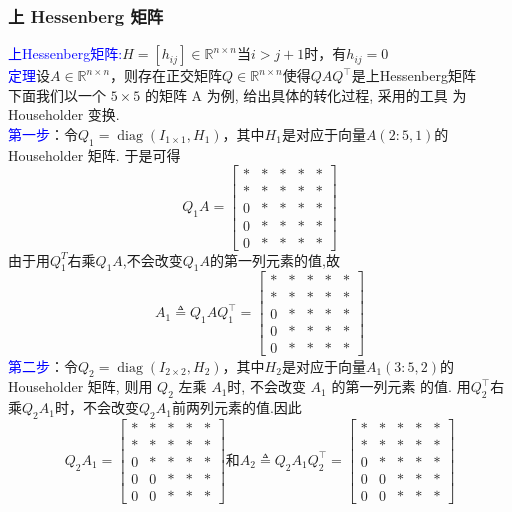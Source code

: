 \documentclass[12pt,a4paper]{article}
\begin{document}
	\subsubsection{上 Hessenberg 矩阵}
	\noindent \textcolor{blue}{上Hessenberg矩阵:}$H=\left[h_{i j}\right] \in \mathbb{R}^{n \times n}$当$i>j+1$时，有$h_{i j}=0$\\
	\textcolor{blue}{定理}设$A \in \mathbb{R}^{n \times n}$，则存在正交矩阵$Q \in \mathbb{R}^{n \times n}$使得$Q A Q^{\top}$是上Hessenberg矩阵\\
	下面我们以一个 $5\times 5$ 的矩阵 A 为例, 给出具体的转化过程, 采用的工具 为 Householder 变换.\\
	\textcolor{blue}{第一步}：令$Q_{1}=\operatorname{diag}\left(I_{1 \times 1}, H_{1}\right)$，其中$H_{1}$是对应于向量$A(2 : 5,1)$的 Householder 矩阵. 于是可得
	$$
	Q_{1} A=\left[\begin{array}{ccccc}
	* &*& *& *&* \\ 
	* &*& *& *&* \\ 
	0 &*& *& *&*\\ 
	0 &*& *& *&*\\ 
	0 &*& *& *&*
	\end{array}\right]
	$$
	由于用$Q_{1}^{T}$右乘$Q_{1} A$,不会改变$Q_{1} A$的第一列元素的值,故
	$$
	A_{1} \triangleq Q_{1} A Q_{1}^{\top}=\left[\begin{array}{ccccc}
	* &*& *& *&* \\ 
	* &*& *& *&* \\ 
	0 &*& *& *&*\\ 
	0 &*& *& *&*\\ 
	0 &*& *& *&*
	\end{array}\right]
	$$
	\textcolor{blue}{第二步}：令$Q_{2}=\operatorname{diag}\left(I_{2 \times 2}, H_{2}\right)$，其中$H_{2}$是对应于向量$A_{1}(3 : 5,2)$的 Householder 矩阵, 则用 $Q_{2}$ 左乘 $A_{1} $时, 不会改变 $A_{1}$ 的第一列元素 的值. 用$Q_{2}^{\top}$右乘$Q_{2} A_{1}$时，不会改变$Q_{2} A_{1}$前两列元素的值.因此
	$$
	Q_{2} A_{1}=\left[\begin{array}{ccccc}
	* &*& *& *&* \\ 
	* &*& *& *&* \\ 
	0 &*& *& *&*\\ 
	0 &0& *& *&*\\ 
	0 &0& *& *&*
	\end{array}\right]和
	A_{2}\triangleq Q_{2} A_{1} Q_{2}^{\top}=\left[\begin{array}{ccccc}
	* &*& *& *&* \\ 
	* &*& *& *&* \\ 
	0 &*& *& *&*\\ 
	0 &0& *& *&*\\ 
	0 &0& *& *&*
	\end{array}\right]
	$$
\end{document}
